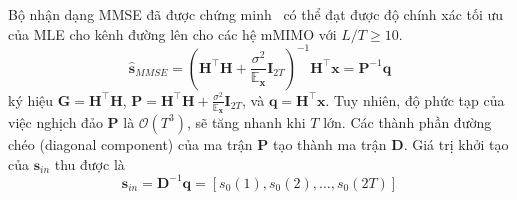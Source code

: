 Bộ nhận dạng MMSE đã được chứng minh~\cite{Rusek2013} có thể đạt được độ chính xác tối ưu của MLE cho kênh đường lên cho các hệ mMIMO với $L/T \ge 10$.
\begin{equation}
    \hat{\mathbf{s}}_{MMSE}=\left(\mathbf{H}^\top \mathbf{H}+\frac{\sigma^2}{\mathbb{E}_\mathbf{x}} \mathbf{I}_{2T}\right)^{-1} \mathbf{H}^\top \mathbf{x}=\mathbf{P}^{-1} \mathbf{q}
\end{equation}
ký hiệu $\mathbf{G} = \mathbf{H}^\top \mathbf{H}$, $\mathbf{P} = \mathbf{H}^\top \mathbf{H}+\frac{\sigma^2}{\mathbb{E}_\mathbf{x}} \mathbf{I}_{2T}$, và $\mathbf{q} = \mathbf{H}^\top \mathbf{x}$. Tuy nhiên, độ phức tạp của việc nghịch đảo $\mathbf{P}$ là $\mathcal{O}(T^3)$, sẽ tăng nhanh khi $T$ lớn. Các thành phần đường chéo (diagonal component) của ma trận $\mathbf{P}$ tạo thành ma trận $\mathbf{D}$. Giá trị khởi tạo của $\mathbf{s}_{in}$ thu được là
\begin{equation}
    \mathbf{s}_{in}=\mathbf{D}^{-1} \mathbf{q}=\left[s_0(1), s_0(2), \ldots, s_0(2T)\right]
\end{equation}


